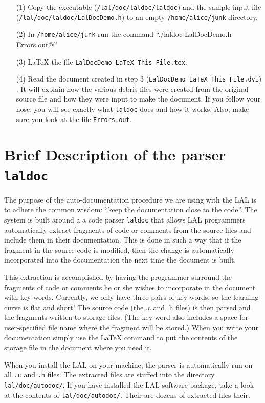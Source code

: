 \documentclass[oneside]{book}
\begin{document}
\begin{itemize}
\item[(1)] Copy the executable ({\tt /lal/doc/laldoc/laldoc}) 
and the  sample input file ({\tt /lal/doc/laldoc/LalDocDemo.h}) to an
empty  {\tt /home/alice/junk} directory. 
\item[(2)] In {\tt /home/alice/junk} 
run the command ``\verb@./laldoc LalDocDemo.h Errors.out@'' 
\item[(3)] {\LaTeX} the file {\texttt {LalDocDemo\_LaTeX\_This\_File.tex}}.
\item[(4)] Read the  document created in step 3
({\texttt {LalDocDemo\_LaTeX\_This\_File.dvi}}) . It will explain how
the various debris files were created from the original source file
and how they were input to make the document.  If you follow your
nose,  you will see exactly what  {\texttt {laldoc}} does and how it
works.  Also, make sure you look at the file {\tt Errors.out}.
\end{itemize}

\section{Brief Description of the parser {\texttt {laldoc}} }

The purpose of the auto-documentation procedure we are using with the
LAL is to adhere the common wisdom: ``keep the documentation close to
the code''.  The system is built around a a code
parser {\tt laldoc} that allows LAL programmers automatically extract fragments of
code or comments from the source files and include them in their
documentation.  This is done in such a way that if the fragment in the
source code is modified, then the change is automatically incorporated
into the documentation the next time the document is built.

This extraction is  accomplished by having the programmer surround the
fragments of code or comments he or she wishes to incorporate in the
document with key-words.  Currently, we only have three pairs of
key-words, so the learning curve is flat and short! The source code
(the .c and .h files) is then parsed and the fragments written to
storage files.  (The key-word also includes a space for user-specified file name
where the fragment will be stored.)  When you write your documentation simply
use the {\LaTeX} command \verb@@ to put the contents of the
storage file in the document where you need it.  

When you install the LAL on your machine, the parser is automatically
run on all {\tt .c} and {\tt .h} files. The extracted files are
stuffed into the directory {\tt lal/doc/autodoc/}.  If you have
installed the LAL software package, take a look at the contents of
{\tt lal/doc/autodoc/}. Their are dozens of extracted files their.
\end{document}

